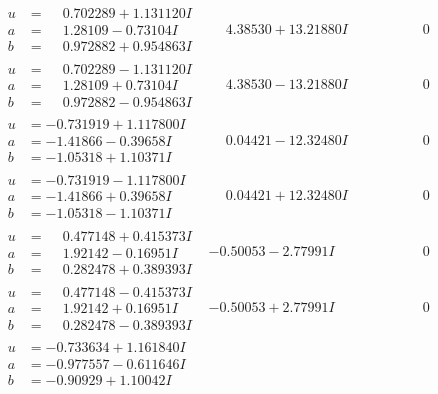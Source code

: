\documentclass[1p]{elsarticle_modified}
\theoremstyle{definition}
\begin{document}
$$\begin{array}{c|c|c}
\begin{aligned}
u &= \phantom{-}0.702289 + 1.131120 I \\
a &= \phantom{-}1.28109 - 0.73104 I \\
b &= \phantom{-}0.972882 + 0.954863 I\end{aligned}
 & \phantom{-}4.38530 + 13.21880 I & \phantom{-0.000000 } 0 \\ \hline\begin{aligned}
u &= \phantom{-}0.702289 - 1.131120 I \\
a &= \phantom{-}1.28109 + 0.73104 I \\
b &= \phantom{-}0.972882 - 0.954863 I\end{aligned}
 & \phantom{-}4.38530 - 13.21880 I & \phantom{-0.000000 } 0 \\ \hline\begin{aligned}
u &= -0.731919 + 1.117800 I \\
a &= -1.41866 - 0.39658 I \\
b &= -1.05318 + 1.10371 I\end{aligned}
 & \phantom{-}0.04421 - 12.32480 I & \phantom{-0.000000 } 0 \\ \hline\begin{aligned}
u &= -0.731919 - 1.117800 I \\
a &= -1.41866 + 0.39658 I \\
b &= -1.05318 - 1.10371 I\end{aligned}
 & \phantom{-}0.04421 + 12.32480 I & \phantom{-0.000000 } 0 \\ \hline\begin{aligned}
u &= \phantom{-}0.477148 + 0.415373 I \\
a &= \phantom{-}1.92142 - 0.16951 I \\
b &= \phantom{-}0.282478 + 0.389393 I\end{aligned}
 & -0.50053 - 2.77991 I & \phantom{-0.000000 } 0 \\ \hline\begin{aligned}
u &= \phantom{-}0.477148 - 0.415373 I \\
a &= \phantom{-}1.92142 + 0.16951 I \\
b &= \phantom{-}0.282478 - 0.389393 I\end{aligned}
 & -0.50053 + 2.77991 I & \phantom{-0.000000 } 0 \\ \hline\begin{aligned}
u &= -0.733634 + 1.161840 I \\
a &= -0.977557 - 0.611646 I \\
b &= -0.90929 + 1.10042 I\end{aligned}

\end{array}$$
\end{document}
